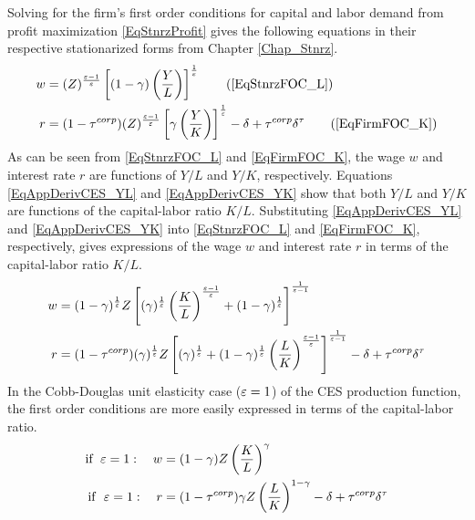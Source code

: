     Solving for the firm's first order conditions for capital and labor demand from profit maximization \eqref{EqStnrzProfit} gives the following equations in their respective stationarized forms from Chapter \ref{Chap_Stnrz}.
    \begin{align}
      w &= (Z)^\frac{\ve-1}{\ve}\left[(1-\gamma)\left(\frac{Y}{L}\right)\right]^\frac{1}{\ve} \tag{\ref{EqStnrzFOC_L}} \\
      r &= (1 - \tau^{corp})(Z)^\frac{\ve-1}{\ve}\left[\gamma\left(\frac{Y}{K}\right)\right]^\frac{1}{\ve} - \delta + \tau^{corp}\delta^\tau \tag{\ref{EqFirmFOC_K}}
    \end{align}
    As can be seen from \eqref{EqStnrzFOC_L} and \eqref{EqFirmFOC_K}, the wage $w$ and interest rate $r$ are functions of $Y/L$ and $Y/K$, respectively. Equations \eqref{EqAppDerivCES_YL} and \eqref{EqAppDerivCES_YK} show that both $Y/L$ and $Y/K$ are functions of the capital-labor ratio $K/L$. Substituting \eqref{EqAppDerivCES_YL} and \eqref{EqAppDerivCES_YK} into \eqref{EqStnrzFOC_L} and \eqref{EqFirmFOC_K}, respectively, gives expressions of the wage $w$ and interest rate $r$ in terms of the capital-labor ratio $K/L$.
    \begin{align}
      w &= (1-\gamma)^\frac{1}{\varepsilon}Z\left[(\gamma)^\frac{1}{\varepsilon}\left(\frac{K}{L}\right)^\frac{\varepsilon-1}{\varepsilon} + (1-\gamma)^\frac{1}{\varepsilon}\right]^\frac{1}{\varepsilon-1} \label{EqAppDerivCES_FOCL} \\
      r &= (1 - \tau^{corp})(\gamma)^\frac{1}{\varepsilon}Z\left[(\gamma)^\frac{1}{\varepsilon} + (1-\gamma)^\frac{1}{\varepsilon}\left(\frac{L}{K}\right)^\frac{\varepsilon-1}{\varepsilon}\right]^\frac{1}{\varepsilon-1} - \delta + \tau^{corp}\delta^\tau \label{EqAppDerivCES_FOCK}
    \end{align}
    In the Cobb-Douglas unit elasticity case ($\varepsilon=1$) of the CES production function, the first order conditions are more easily expressed in terms of the capital-labor ratio.
    \begin{align}
      \text{if}\:\:\,\varepsilon=1:\quad w &= (1-\gamma)Z\left(\frac{K}{L}\right)^\gamma \label{EqAppDerivCES_CDFOCL} \\
      \text{if}\:\:\:\varepsilon=1:\quad r &= (1 - \tau^{corp})\gamma Z\left(\frac{L}{K}\right)^{1-\gamma} - \delta + \tau^{corp}\delta^\tau \label{EqAppDerivCES_CDFOCK}
    \end{align}

